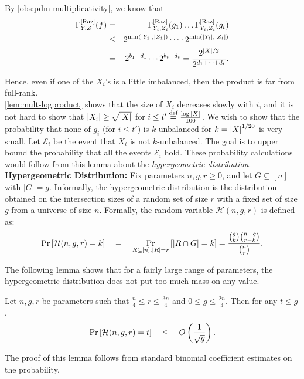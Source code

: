 By \autoref{obs:pdm-multiplicativity}, we know that 
\begin{eqnarray*}
\Gamma^{\mathrm{[Raz]}}_{Y,Z}(f) & = & \Gamma^{\mathrm{[Raz]}}_{Y_i,Z_i}(g_1) \dots \Gamma^{\mathrm{[Raz]}}_{Y_i,Z_i}(g_t)\\
 & \leq & 2^{\min(|Y_1|,|Z_1|)} \cdots  \cdot 2^{\min(|Y_t|,|Z_t|)}\\ 
 & = & 2^{b_1  - d_1} \cdots 2^{b_t - d_t} = \frac{2^{|X|/2}}{2^{d_1 + \dots + d_t}}.
\end{eqnarray*}

Hence, even if one of the $X_i$'s is a little imbalanced, then the product is far from full-rank. \\

\autoref{lem:mult-logproduct} shows that the size of $X_i$ decreases slowly with $i$, and it is not hard to show that $\left|X_i\right| \geq \sqrt{\left|X\right|}$ for $i \leq t'\stackrel{\text{def}}{=}\frac{\log{\left|X\right|}}{100}$. 
We wish to show that the probability that none of $g_i$ (for $i\leq t'$) is $k$-unbalanced for $k = \left|X\right|^{1/20}$ is very small. 
Let $\mathcal{E}_i$ be the event that $X_i$ is not $k$-unbalanced. 
The goal is to upper bound the probability that all the events $\mathcal{E}_i$ hold. 
These probability calculations would follow from this lemma about the \emph{hypergeometric distribution}.\\

{\bf Hypergeometric Distribution: } Fix parameters $n, g, r \geq 0$, and let $G \subseteq [n]$ with $|G| = g$. 
Informally, the hypergeometric distribution is the distribution obtained on the intersection sizes of a random set of size $r$ with a fixed set of size $g$ from a universe of size $n$. 
Formally, the random variable $\mathcal{H}(n,g,r)$ is defined as:
$$
\Pr\left[\mathcal{H}(n,g,r) = k\right] \quad = \quad \Pr_{R\subseteq [n],|R| = r}\left[\left|R \cap G\right| = k\right] = \frac{\binom{g}{k}\binom{n-g}{r-k}}{\binom{n}{r}}.
$$


The following lemma shows that for a fairly large range of parameters, the hypergeometric distribution does not put too much mass on any value.

\begin{lemma}\label{lem:hypergeom_low-weight}
  Let $n,g,r$ be parameters such that $\frac{n}{4} \leq r \leq \frac{3n}{4}$ and $0\leq g\leq \frac{2n}{3}$. 
Then for any $t\leq g$,
  $$
  \Pr\left[\mathcal{H}(n,g,r) = t\right] \quad \leq \quad O\left(\frac{1}{\sqrt{g}}\right).
  $$
\end{lemma}
The proof of this lemma follows from standard binomial coefficient estimates on the probability.\\

